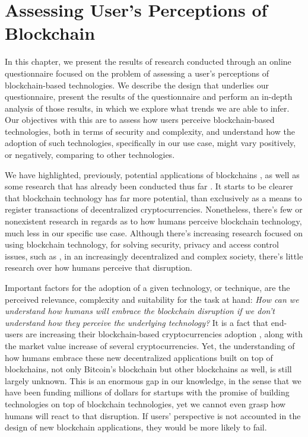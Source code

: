 \chapter{Assessing User's Perceptions of Blockchain}
\label{chap:study}

In this chapter, we present the results of research conducted through an online questionnaire focused on the problem of assessing a user's perceptions of blockchain-based technologies. We describe the design that underlies our questionnaire, present the results of the questionnaire and perform an in-depth analysis of those results, in which we explore what trends we are able to infer. Our objectives with this are to assess how users perceive blockchain-based technologies, both in terms of security and complexity, and understand how the adoption of such technologies, specifically in our use case, might vary positively, or negatively, comparing to other technologies.

We have highlighted, previously, potential applications of blockchains \cite{pilkington_blockchain_2016, crosby_blockchain_2016, underwood_blockchain_2016}, as well as some research that has already been conducted thus far \cite{biswas_securing_2016, ouaddah_fairaccess:_2017, fotiou_decentralized_2016}. It starts to be clearer that blockchain technology has far more potential, than exclusively as a means to register transactions of decentralized cryptocurrencies. Nonetheless, there's few or nonexistent research in regards as to how humans perceive blockchain technology, much less in our specific use case. Although there's increasing research focused on using blockchain technology, for solving security, privacy and access control issues, such as \cite{maesa_blockchain_2017, ouaddah_access_2017, dorri_blockchain_2017, yue_healthcare_2016}, in an increasingly decentralized and complex society, there's little research over how humans perceive that disruption.

Important factors for the adoption of a given technology, or technique, are the perceived relevance, complexity and suitability for the task at hand: \emph{How can we understand how humans will embrace the blockchain disruption if we don't understand how they perceive the underlying technology?} It is a fact that end-users are increasing their blockchain-based cryptocurrencies adoption \cite{bloomberg_crypto_central} \cite{bloomberg_crypto_altcoins} \cite{nyt_crypto_buble}, along with the market value increase of several cryptocurrencies. Yet, the understanding of how humans embrace these new decentralized applications built on top of blockchains, not only Bitcoin's blockchain but other blockchains as well, is still largely unknown. This is an enormous gap in our knowledge, in the sense that we have been funding millions of dollars for startups with the promise of building technologies on top of blockchain technologies, yet we cannot even grasp how humans will react to that disruption. If users' perspective is not accounted in the design of new blockchain applications, they would be more likely to fail.

